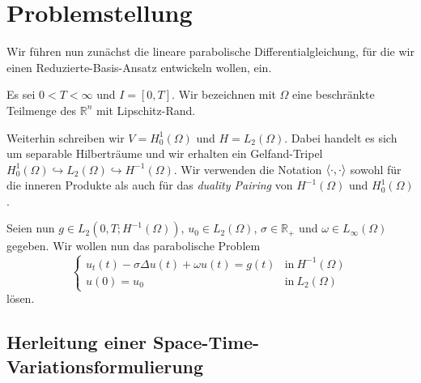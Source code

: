 \section{Problemstellung} %
\label{sub:problemstellung}

Wir führen nun zunächst die lineare parabolische Differentialgleichung, für die wir einen Reduzierte-Basis-Ansatz entwickeln wollen, ein.

Es sei $0 < T < \infty$ und $I = [0, T]$.
Wir bezeichnen mit $\Omega$ eine beschränkte Teilmenge des $\mathbb{R}^{n}$ mit Lipschitz-Rand.

Weiterhin schreiben wir $V = H^{1}_{0}(\Omega)$ und $H = L_{2}(\Omega)$.
Dabei handelt es sich um separable Hilberträume und wir erhalten ein Gelfand-Tripel $H^{1}_{0}(\Omega) \hookrightarrow L_{2}(\Omega) \hookrightarrow H^{-1}(\Omega)$.
Wir verwenden die Notation $\left\langle\cdot,\cdot\right\rangle$ sowohl für die inneren Produkte als auch für das \emph{duality Pairing} von $H^{-1}(\Omega)$ und $H^{1}_{0}(\Omega)$.

Seien nun $g \in L_{2}(0, T; H^{-1}(\Omega))$, $u_{0} \in L_{2}(\Omega)$, $\sigma \in \mathbb{R_{+}}$ und $\omega \in L_{\infty}(\Omega)$ gegeben.
Wir wollen nun das parabolische Problem
\begin{equation}
    \begin{cases}
        u_{t}(t) - \sigma \Delta u(t) + \omega u(t) = g(t) & \text{in}~H^{-1}(\Omega)\\
        u(0) = u_{0} & \text{in}~L_{2}(\Omega)
    \end{cases}
\end{equation}
lösen.

\subsection{Herleitung einer Space-Time-Variationsformulierung} %

